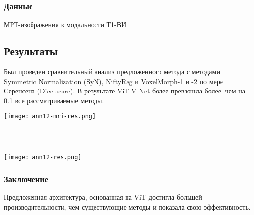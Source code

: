 \subsubsection*{Данные}
МРТ-изображения в модальности Т1-ВИ.
\subsection*{Результаты}
Был проведен сравнительный анализ предложенного метода с методами Symmetric 
Normalization (SyN), NiftyReg и VoxelMorph-1 и -2 по мере Серенсена (Dice score).
В результате ViT-V-Net более превзошла более, чем на 0.1 все рассматриваемые методы.
\\
\begin{minipage}{1.0\linewidth}
    \begin{center}
        \texttt{[image: ann12-mri-res.png]} \\
    \end{center}

\end{minipage}
\\
\\
\begin{minipage}{1.0\linewidth}
    \begin{center}
        \texttt{[image: ann12-res.png]} \\
    \end{center}

\end{minipage}
\subsubsection*{Заключение}
Предложенная архитектура, основанная на ViT достигла большей производительности, чем 
существующие методы и показала свою эффективность.